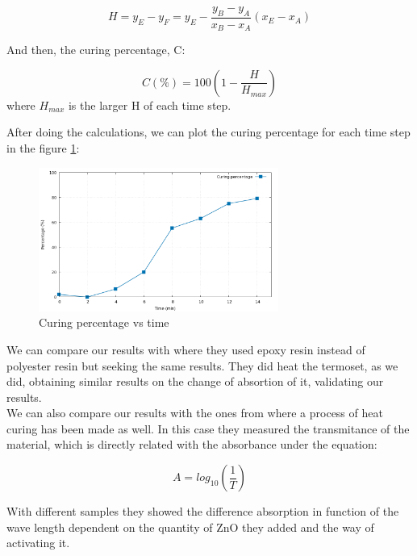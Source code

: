 \begin{equation}
	H = y_E - y_F = y_E - \frac{y_B-y_A}{x_B-x_A} \left(x_E-x_A\right)
\end{equation}

And then, the curing percentage, C:

\begin{equation}
	C(\%) = 100 \left(1-\frac{H}{H_{max}}\right)
\end{equation}
where $H_{max}$ is the larger H of each time step.

After doing the calculations, we can plot the curing percentage for each time step
in the figure \ref{fig:curing_time}:

\begin{figure}[h]
	\centering
	\includegraphics[width=0.7\textwidth]{img/curing_time.png}
	\caption{Curing percentage vs time}
	\label{fig:curing_time}
\end{figure}

We can compare our results with \cite{Canavate2000} where they used epoxy resin instead of polyester
resin but seeking the same results. They did heat the termoset, as we did, obtaining
similar results on the change of absortion of it, validating our results.\\

We can also compare our results with the ones from \cite{Jawad2016} where a process of heat
curing has been made as well. In this case they measured the transmitance of the
material, which is directly related with the absorbance under the equation:

\begin{equation}
	A = log_{10}\left(\frac{1}{T}\right)
\end{equation}

With different samples they showed the difference absorption in function of the
wave length dependent on the quantity of ZnO they added and the way of activating it.\\

